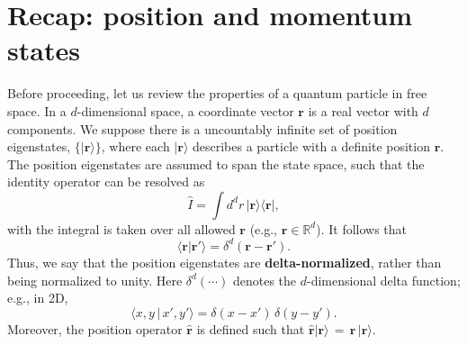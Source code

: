 \documentclass[pra,12pt]{revtex4-2}
\begin{document}
\section{Recap: position and momentum states}
\label{sec:waves}

Before proceeding, let us review the properties of a quantum particle
in free space.  In a $d$-dimensional space, a coordinate vector
$\mathbf{r}$ is a real vector with $d$ components.  We suppose there
is a uncountably infinite set of position eigenstates,
$\{|\mathbf{r}\rangle\}$, where each $|\mathbf{r}\rangle$ describes a
particle with a definite position $\mathbf{r}$.  The position
eigenstates are assumed to span the state space, such that the
identity operator can be resolved as
\begin{equation}
  \hat{I} = \int d^dr \, |\mathbf{r}\rangle \langle\mathbf{r}|,
  \label{Iresol}
\end{equation}
with the integral is taken over all allowed $\mathbf{r}$ (e.g.,
$\mathbf{r} \in \mathbb{R}^d$).  It follows that
\begin{equation}
  \langle \mathbf{r} | \mathbf{r}' \rangle = \delta^d(\mathbf{r}-\mathbf{r}').
  \label{rrprime}
\end{equation}
Thus, we say that the position eigenstates are
\textbf{delta-normalized}, rather than being normalized to unity.
Here $\delta^d(\cdots)$ denotes the $d$-dimensional delta function;
e.g., in 2D,
\begin{equation*}
  \langle x,y \,|\, x',y' \rangle = \delta(x-x') \, \delta(y-y').
\end{equation*}
Moreover, the position operator $\hat{\mathbf{r}}$ is defined such
that $\hat{\mathbf{r}} |\mathbf{r}\rangle \,=\, \mathbf{r}\,
|\mathbf{r}\rangle$.
\end{document}
